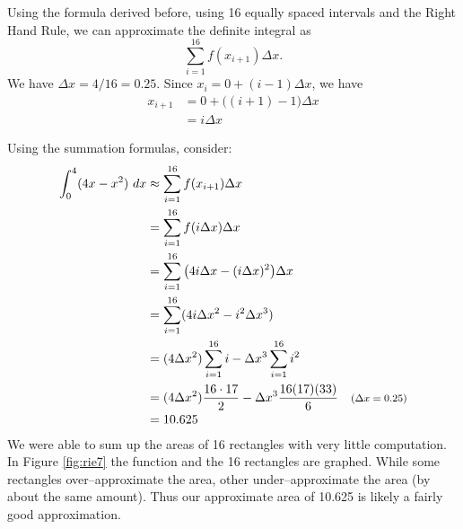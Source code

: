 {Using the formula derived before, using 16 equally spaced intervals and the Right Hand Rule, we can approximate the definite integral as $$\sum_{i=1}^{16}f(x_{i+1})\Delta x.$$
We have $\Delta x = 4/16 = 0.25$. Since $x_i = 0+(i-1)\Delta x$, we have 
\begin{align*}
x_{i+1} &= 0 + \big((i+1)-1\big)\Delta x \\
				&=	i\Delta x
\end{align*}

Using the summation formulas, consider:
\begin{align}
\int_0^4 (4x-x^2)\ dx &\approx \sum_{i=1}^{16} f(x_{i+1})\Delta x \notag\\
											&= \sum_{i=1}^{16} f(i\Delta x) \Delta x\notag\\
									&= \sum_{i=1}^{16} \big(4i\Delta x - (i\Delta x)^2\big)\Delta x\notag\\
									&= \sum_{i=1}^{16} (4i\Delta x^2 - i^2\Delta x^3)\notag\\		
									&= (4\Delta x^2)\sum_{i=1}^{16} i - \Delta x^3 \sum_{i=1}^{16} i^2 \label{eq:rie7}\\
									&= (4\Delta x^2)\frac{16\cdot 17}{2} - \Delta x^3 \frac{16(17)(33)}6 \quad \text{\footnotesize $(\Delta x = 0.25)$}\notag\\
									&=10.625\notag
\end{align}
We were able to sum up the areas of 16 rectangles with very little computation. In Figure \ref{fig:rie7} the function and the 16 rectangles are graphed. While some rectangles over--approximate the area, other under--approximate the area (by about the same amount). Thus our approximate area of 10.625 is likely a fairly good approximation.
\enlargethispage{2\baselineskip} 

}
